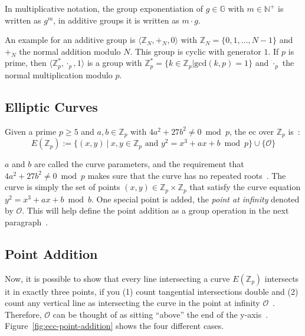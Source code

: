 In multiplicative notation, the group exponentiation of $g \in \mathbb{G}$ with $m \in \mathbb{N}^+$ is written as $g^m$, in additive groups it is written as $m \cdot g$.

An example for an additive group is $\langle \mathbb{Z}_N, +_N, 0 \rangle$ with $\mathbb{Z}_N = \{0, 1, \dots, N-1\}$ and $+_N$ the normal addition modulo $N$.
This group is cyclic with generator $1$.
If $p$ is prime, then $\langle \mathbb{Z}^*_p, \cdot_p, 1 \rangle$ is a group with $\mathbb{Z}^*_p = \{k \in \mathbb{Z}_p | \text{gcd}(k,p) = 1\}$ and $\cdot_p$ the normal multiplication modulo $p$.

\subsection{Elliptic Curves}

\begin{definition}
    Given a prime $p \geq 5$ and $a, b \in \mathbb{Z}_p$ with $4a^2 + 27b^2 \neq 0 \bmod{p}$, the \gls{ec} over $\mathbb{Z}_p$ is~\cite{katz_introduction_2015}:
    \begin{equation}
        E(\mathbb{Z}_p) := \{(x, y)~|~x,y \in \mathbb{Z}_p \text{ and } y^2 = x^3 + a x + b \bmod{p}\} \cup \{\mathcal{O}\}
    \end{equation}
\end{definition}

$a$ and $b$ are called the curve parameters, and the requirement that $4a^2 + 27b^2 \neq 0 \bmod{p}$ makes sure that the curve has no repeated roots~\cite{katz_introduction_2015}.
The curve is simply the set of points $(x, y) \in \mathbb{Z}_p \times \mathbb{Z}_p$ that satisfy the curve equation $y^2 = x^3 + a x + b \bmod{b}$.
One special point is added, the \emph{point at infinity} denoted by $\mathcal{O}$.
This will help define the point addition as a group operation in the next paragraph~\cite{katz_introduction_2015}.

\subsection{Point Addition}
Now, it is possible to show that every line intersecting a curve $E(\mathbb{Z}_p)$ intersects it in exactly three points, if you (1) count tangential intersections double and (2) count any vertical line as intersecting the curve in the point at infinity $\mathcal{O}$~\cite{katz_introduction_2015}.
Therefore, $\mathcal{O}$ can be thought of as sitting ``above'' the end of the y-axis~\cite{katz_introduction_2015}.
Figure~\ref{fig:ecc-point-addition} shows the four different cases.

